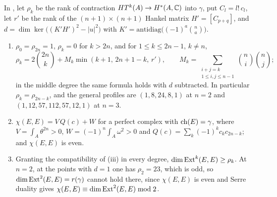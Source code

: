 \begin{proposition}
\label{prop:p2primeprofile}
In , let $\rho_{k}$ be the rank of contraction
$HT^{k}(A)\to H^{*}(A,\mathbb{C})$ into $\gamma$, put $C_{l}=l!\,c_{l}$, let
$r'$ be the rank of the $(n+1)\times(n+1)$ Hankel matrix $H'=[C_{p+q}]$, and
$d=\dim\ker\bigl((K'H')^{2}-|u|^{2}\bigr)$ with
$K'=\mathrm{antidiag}\bigl((-1)^{a}\binom{n}{a}\bigr)$.
\begin{enumerate}[label=\textup{(\roman*)},leftmargin=2.6em,itemsep=2pt]
\item $\rho_{0}=\rho_{2n}=1$, $\rho_{k}=0$ for $k>2n$, and for
  $1\le k\le2n-1$, $k\ne n$,
  \[
    \rho_{k}=2\binom{2n}{k}+M_{k}\min(k+1,\,2n+1-k,\,r'),\qquad
    M_{k}=\sum_{\substack{i+j=k\\1\le i,j\le n-1}}\binom{n}{i}\binom{n}{j};
  \]
  in the middle degree the same formula holds with $d$ subtracted. In particular $\rho_{k}=\rho_{2n-k}$, and the general
  profiles are $(1,8,24,8,1)$ at $n=2$ and $(1,12,57,112,57,12,1)$ at
  $n=3$.
\item $\chi(E,E)=V\,Q(c)+W$ for a perfect complex with $\operatorname{ch}(E)=\gamma$, where
  $V=\int_{A}\theta^{2n}>0$, $W=(-1)^{n}\int_{A}\omega^{2}>0$ and
  $Q(c)=\sum_{k}(-1)^{k}c_{k}c_{2n-k}$; and $\chi(E,E)$ is even.
\item Granting the compatibility of (iii) in every degree,
  $\dim\operatorname{Ext}^{k}(E,E)\ge\rho_{k}$. At $n=2$, at the points with $d=1$ one has
  $\rho_{2}=23$, which is odd, so $\dim\operatorname{Ext}^{2}(E,E)=r(\gamma)$ cannot hold
  there, since $\chi(E,E)$ is even and Serre duality gives
  $\chi(E,E)\equiv\dim\operatorname{Ext}^{2}(E,E)\bmod2$.
\end{enumerate}
\end{proposition}


